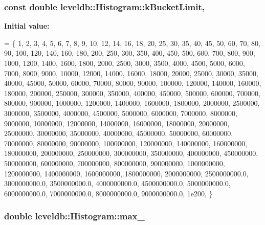 \subsubsection[{k\+Bucket\+Limit}]{\setlength{\rightskip}{0pt plus 5cm}const double leveldb\+::\+Histogram\+::k\+Bucket\+Limit\hspace{0.3cm}{\ttfamily [static]}, {\ttfamily [private]}}\label{classleveldb_1_1_histogram_aaad18e83be993ecfe63a566869a9d3cc}
{\bfseries Initial value\+:}
\begin{DoxyCode}
= \{
  1, 2, 3, 4, 5, 6, 7, 8, 9, 10, 12, 14, 16, 18, 20, 25, 30, 35, 40, 45,
  50, 60, 70, 80, 90, 100, 120, 140, 160, 180, 200, 250, 300, 350, 400, 450,
  500, 600, 700, 800, 900, 1000, 1200, 1400, 1600, 1800, 2000, 2500, 3000,
  3500, 4000, 4500, 5000, 6000, 7000, 8000, 9000, 10000, 12000, 14000,
  16000, 18000, 20000, 25000, 30000, 35000, 40000, 45000, 50000, 60000,
  70000, 80000, 90000, 100000, 120000, 140000, 160000, 180000, 200000,
  250000, 300000, 350000, 400000, 450000, 500000, 600000, 700000, 800000,
  900000, 1000000, 1200000, 1400000, 1600000, 1800000, 2000000, 2500000,
  3000000, 3500000, 4000000, 4500000, 5000000, 6000000, 7000000, 8000000,
  9000000, 10000000, 12000000, 14000000, 16000000, 18000000, 20000000,
  25000000, 30000000, 35000000, 40000000, 45000000, 50000000, 60000000,
  70000000, 80000000, 90000000, 100000000, 120000000, 140000000, 160000000,
  180000000, 200000000, 250000000, 300000000, 350000000, 400000000,
  450000000, 500000000, 600000000, 700000000, 800000000, 900000000,
  1000000000, 1200000000, 1400000000, 1600000000, 1800000000, 2000000000,
  2500000000.0, 3000000000.0, 3500000000.0, 4000000000.0, 4500000000.0,
  5000000000.0, 6000000000.0, 7000000000.0, 8000000000.0, 9000000000.0,
  1e200,
\}
\end{DoxyCode}
\hypertarget{classleveldb_1_1_histogram_afd840834f24cdc85ee08fc6158495327}{}
\subsubsection[{max\+\_\+}]{\setlength{\rightskip}{0pt plus 5cm}double leveldb\+::\+Histogram\+::max\+\_\+\hspace{0.3cm}{\ttfamily [private]}}\label{classleveldb_1_1_histogram_afd840834f24cdc85ee08fc6158495327}
\hypertarget{classleveldb_1_1_histogram_aa074ae70ad7abbdaf12b97282eb1b700}{}
